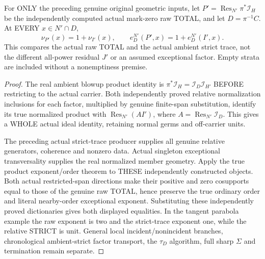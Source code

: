 \begin{theorem}
\label{hir:sharp-actual-first-raw-total-ambient-strict-exponent-shift}
\leanok
For ONLY the preceding genuine original geometric inputs, let
$P'=\operatorname{Res}_{N'}\pi^*\mathcal I_H$ be the independently
computed actual mark-zero raw TOTAL, and let $D=\pi^{-1}C$. At EVERY
$x\in N'\cap D$,
\[
 \nu_{P'}(x)=1+\nu_{I'}(x),\qquad
 e_D^{N'}(P',x)=1+e_D^{N'}(I',x).
\]
This compares the actual raw TOTAL and the actual ambient strict trace,
not the different all-power residual $J'$ or an assumed exceptional
factor. Empty strata are included without a nonemptiness premise.
\end{theorem}
\begin{proof}
The real ambient blowup product identity is
$\pi^*\mathcal I_H=\mathcal I_D\mathcal I_{H'}$ BEFORE restricting
to the actual carrier. Both independently proved relative normalization
inclusions for each factor, multiplied by genuine finite-span
substitution, identify its true normalized product with
$\operatorname{Res}_{N'}(A I')$, where
$A=\operatorname{Res}_{N'}\mathcal I_D$. This gives a WHOLE actual ideal
identity, retaining normal germs and off-carrier units.

The preceding actual strict-trace producer supplies all genuine relative
generators, coherence and nonzero data. Actual singleton exceptional
transversality supplies the real normalized member geometry. Apply the
true product exponent/order theorem to THESE independently constructed
objects. Both actual restricted-span directions make their positive and
zero cosupports equal to those of the genuine raw TOTAL, hence preserve
the true ordinary order and literal nearby-order exceptional exponent.
Substituting these independently proved dictionaries gives both displayed
equalities. In the tangent parabola example the raw exponent is two and
the strict-trace exponent one, while the relative STRICT is unit. General
local incident/nonincident branches, chronological ambient-strict factor
transport, the $\tau_D$ algorithm, full sharp $\Sigma$ and termination
remain separate.
\end{proof}
